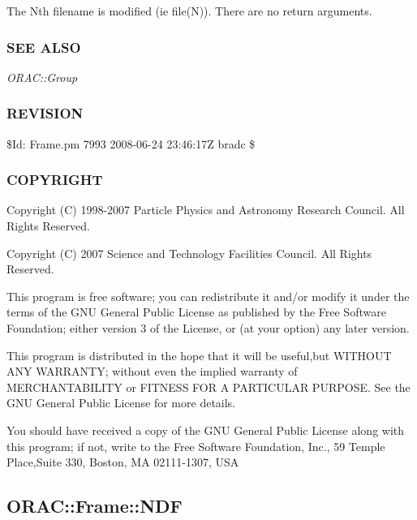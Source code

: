\begin{description}
\begin{description}
The Nth filename is modified (ie file(N)).
There are no return arguments.

\end{description}
\subsubsection*{SEE ALSO\label{ORAC::Frame_SEE_ALSO}}


\emph{ORAC::Group}

\subsubsection*{REVISION\label{ORAC::Frame_REVISION}}


\$Id: Frame.pm 7993 2008-06-24 23:46:17Z bradc \$

\subsubsection*{COPYRIGHT\label{ORAC::Frame_COPYRIGHT}}


Copyright (C) 1998-2007 Particle Physics and Astronomy Research
Council. All Rights Reserved.



Copyright (C) 2007 Science and Technology Facilities Council.  All
Rights Reserved.



This program is free software; you can redistribute it and/or modify it under
the terms of the GNU General Public License as published by the Free Software
Foundation; either version 3 of the License, or (at your option) any later
version.



This program is distributed in the hope that it will be useful,but WITHOUT ANY
WARRANTY; without even the implied warranty of MERCHANTABILITY or FITNESS FOR A
PARTICULAR PURPOSE. See the GNU General Public License for more details.



You should have received a copy of the GNU General Public License along with
this program; if not, write to the Free Software Foundation, Inc., 59 Temple
Place,Suite 330, Boston, MA  02111-1307, USA

\subsection{ORAC::Frame::NDF\label{ORAC::Frame::NDF}}



\end{description}
